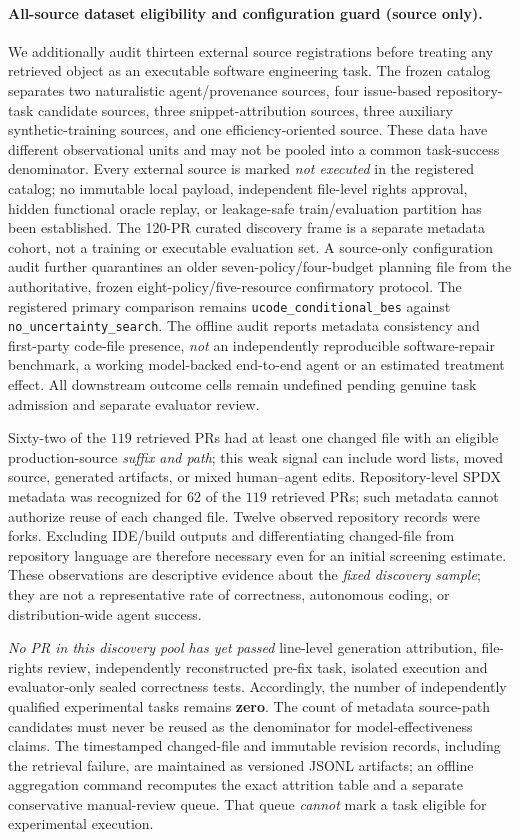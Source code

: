 \documentclass[pdflatex,sn-basic]{sn-jnl}
\begin{document}
\paragraph{All-source dataset eligibility and configuration guard (source only).}
We additionally audit thirteen external source registrations
before treating any retrieved object as an executable software
engineering task. The frozen catalog separates two naturalistic
agent/provenance sources, four issue-based repository-task
candidate sources, three snippet-attribution sources, three
auxiliary synthetic-training sources, and one efficiency-oriented
source. These data have different observational units and may not
be pooled into a common task-success denominator. Every external
source is marked \emph{not executed} in the registered catalog;
no immutable local payload, independent file-level rights approval,
hidden functional oracle replay, or leakage-safe train/evaluation
partition has been established. The 120-PR curated discovery
frame is a separate metadata cohort, not a training or executable
evaluation set. A source-only configuration audit further
quarantines an older seven-policy/four-budget planning file
from the authoritative, frozen eight-policy/five-resource
confirmatory protocol. The registered primary comparison remains
\texttt{ucode\_conditional\_bes} against
\texttt{no\_uncertainty\_search}. The offline audit reports
metadata consistency and first-party code-file presence,
\emph{not} an independently reproducible software-repair
benchmark, a working model-backed end-to-end agent or an
estimated treatment effect. All downstream outcome cells
remain undefined pending genuine task admission and
separate evaluator review.

Sixty-two of the $119$ retrieved PRs had at least
one changed file with an eligible production-source
\emph{suffix and path}; this weak signal can include
word lists, moved source, generated artifacts, or
mixed human--agent edits. Repository-level SPDX
metadata was recognized for $62$ of the $119$
retrieved PRs; such metadata cannot authorize reuse
of each changed file. Twelve observed repository
records were forks. Excluding IDE/build outputs
and differentiating changed-file from repository
language are therefore necessary even for an
initial screening estimate. These observations
are descriptive evidence about the \emph{fixed
discovery sample}; they are not a representative
rate of correctness, autonomous coding, or
distribution-wide agent success.

\emph{No PR in this discovery pool has yet passed}
line-level generation attribution, file-rights
review, independently reconstructed pre-fix task,
isolated execution and evaluator-only sealed
correctness tests. Accordingly, the number of
independently qualified experimental tasks
remains \textbf{zero}. The count of metadata
source-path candidates must never be reused as the
denominator for model-effectiveness claims.
The timestamped changed-file and immutable
revision records, including the retrieval failure,
are maintained as versioned JSONL artifacts; an
offline aggregation command recomputes the
exact attrition table and a separate conservative
manual-review queue. That queue \emph{cannot}
mark a task eligible for experimental execution.
\end{document}

